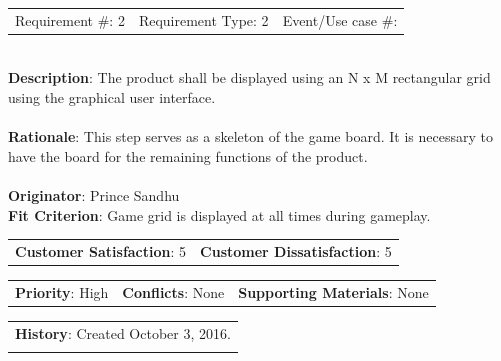 \documentclass[12pt, titlepage]{article}
\begin{document}
\begin{reqbox}

\begin{tabular}{lll}
Requirement \#: 2 & Requirement Type: 2 & Event/Use case \#: \\
\end{tabular} \\

\textbf{Description}: The product shall be displayed using an N x M rectangular grid using the graphical user interface. \\ \\
\textbf{Rationale}: This step serves as a skeleton of the game board. It is necessary to have the board for the remaining
functions of the product.\\ \\
\textbf{Originator}: Prince Sandhu \\
\textbf{Fit Criterion}: Game grid is displayed at all times during gameplay.\\

\begin{tabular}{ll}
\textbf{Customer Satisfaction}: 5 & \textbf{Customer Dissatisfaction}: 5 \\
\end{tabular}

\begin{tabular}{lll}
\textbf{Priority}: High & \textbf{Conflicts}: None & \textbf{Supporting Materials}: None \\
\end{tabular}

\begin{tabular}{l}
\textbf{History}: Created October 3, 2016.\\ \\
\end{tabular}

\end{reqbox}
\end{document}
